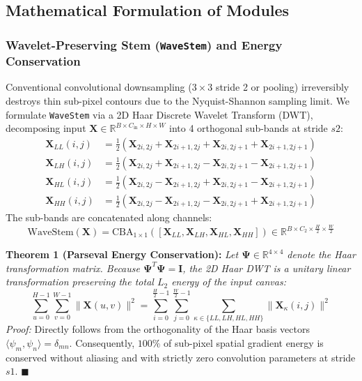 \documentclass[11pt,a4paper]{article}
\begin{document}
\subsection{Mathematical Formulation of Modules}

\subsubsection{Wavelet-Preserving Stem (\texttt{WaveStem}) and Energy Conservation}
Conventional convolutional downsampling ($3\times 3$ stride 2 or pooling) irreversibly destroys thin sub-pixel contours due to the Nyquist-Shannon sampling limit. We formulate \texttt{WaveStem} via a 2D Haar Discrete Wavelet Transform (DWT), decomposing input $\mathbf{X} \in \mathbb{R}^{B \times C_{\text{in}} \times H \times W}$ into 4 orthogonal sub-bands at stride $s2$:
\begin{align}
\mathbf{X}_{LL}(i, j) &= \frac{1}{2}\left(\mathbf{X}_{2i, 2j} + \mathbf{X}_{2i+1, 2j} + \mathbf{X}_{2i, 2j+1} + \mathbf{X}_{2i+1, 2j+1}\right) \\
\mathbf{X}_{LH}(i, j) &= \frac{1}{2}\left(\mathbf{X}_{2i, 2j} + \mathbf{X}_{2i+1, 2j} - \mathbf{X}_{2i, 2j+1} - \mathbf{X}_{2i+1, 2j+1}\right) \\
\mathbf{X}_{HL}(i, j) &= \frac{1}{2}\left(\mathbf{X}_{2i, 2j} - \mathbf{X}_{2i+1, 2j} + \mathbf{X}_{2i, 2j+1} - \mathbf{X}_{2i+1, 2j+1}\right) \\
\mathbf{X}_{HH}(i, j) &= \frac{1}{2}\left(\mathbf{X}_{2i, 2j} - \mathbf{X}_{2i+1, 2j} - \mathbf{X}_{2i, 2j+1} + \mathbf{X}_{2i+1, 2j+1}\right)
\end{align}
The sub-bands are concatenated along channels:
\begin{equation}
\text{WaveStem}(\mathbf{X}) = \text{CBA}_{1\times 1}\left(\left[\mathbf{X}_{LL}, \mathbf{X}_{LH}, \mathbf{X}_{HL}, \mathbf{X}_{HH}\right]\right) \in \mathbb{R}^{B \times C_2 \times \frac{H}{2} \times \frac{W}{2}}
\end{equation}

\noindent\textbf{Theorem 1 (Parseval Energy Conservation):} \textit{Let $\mathbf{\Psi} \in \mathbb{R}^{4 \times 4}$ denote the Haar transformation matrix. Because $\mathbf{\Psi}^T \mathbf{\Psi} = \mathbf{I}$, the 2D Haar DWT is a unitary linear transformation preserving the total $L_2$ energy of the input canvas:}
\begin{equation}
\sum_{u=0}^{H-1} \sum_{v=0}^{W-1} \|\mathbf{X}(u, v)\|^2 = \sum_{i=0}^{\frac{H}{2}-1} \sum_{j=0}^{\frac{W}{2}-1} \sum_{\kappa \in \{LL, LH, HL, HH\}} \|\mathbf{X}_{\kappa}(i, j)\|^2
\end{equation}
\textit{Proof:} Directly follows from the orthogonality of the Haar basis vectors $\langle \psi_m, \psi_n \rangle = \delta_{mn}$. Consequently, $100\%$ of sub-pixel spatial gradient energy is conserved without aliasing and with strictly zero convolution parameters at stride $s1$. \hfill $\blacksquare$
\end{document}
